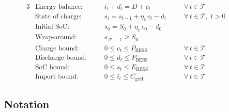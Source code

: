\documentclass[11pt]{article}
\begin{document}
\begin{alignat}{3}
& \text{Energy balance:}
    &\quad & i_t + d_t = D + c_t
    && \quad \forall\, t \in \mathcal{T}
    \tag{3} \\[4pt]
& \text{State of charge:}
    && s_t = s_{t-1} + \eta_{\text{c}}\, c_t - d_t
    && \quad \forall\, t \in \mathcal{T},\; t > 0
    \tag{4} \\[4pt]
& \text{Initial SoC:}
    && s_0 = S_0 + \eta_{\text{c}}\, c_0 - d_0
    &&
    \tag{5} \\[4pt]
& \text{Wrap-around:}
    && s_{|\mathcal{T}|-1} \geq S_0
    &&
    \tag{6} \\[4pt]
& \text{Charge bound:}
    && 0 \leq c_t \leq P_{\text{BESS}}
    && \quad \forall\, t \in \mathcal{T}
    \tag{7} \\[4pt]
& \text{Discharge bound:}
    && 0 \leq d_t \leq P_{\text{BESS}}
    && \quad \forall\, t \in \mathcal{T}
    \tag{8} \\[4pt]
& \text{SoC bound:}
    && 0 \leq s_t \leq E_{\text{BESS}}
    && \quad \forall\, t \in \mathcal{T}
    \tag{9} \\[4pt]
& \text{Import bound:}
    && 0 \leq i_t \leq C_{\text{grid}}
    && \quad \forall\, t \in \mathcal{T}
    \tag{10}
\end{alignat}

\:
\subsection*{Notation}
\end{document}
